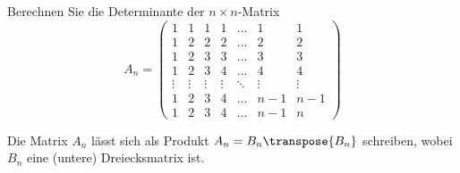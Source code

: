 Berechnen Sie die Determinante der $n\times n$-Matrix
\[
A_n
=
\begin{pmatrix}
     1&     1&     1&     1& \dots&     1&     1\\
     1&     2&     2&     2& \dots&     2&     2\\
     1&     2&     3&     3& \dots&     3&     3\\
     1&     2&     3&     4& \dots&     4&     4\\
\vdots&\vdots&\vdots&\vdots&\ddots&\vdots&\vdots\\
     1&     2&     3&     4& \dots&   n-1&   n-1\\
     1&     2&     3&     4& \dots&   n-1&     n
\end{pmatrix}
\]
\begin{hinweis}
Die Matrix $A_n$ lässt sich als Produkt $A_n=B_n\transpose{B_n}$ schreiben, wobei 
$B_n$ eine (untere) Dreiecksmatrix ist.
\end{hinweis}


